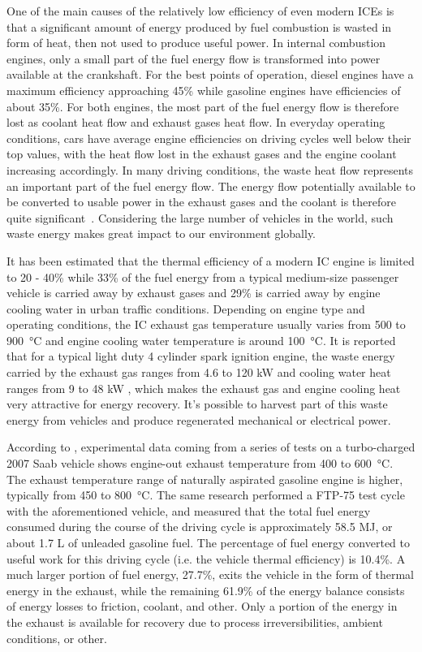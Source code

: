 One of the main causes of the relatively low efficiency of even modern ICEs is that a significant amount of energy produced by fuel combustion is wasted in form of heat, then not used to produce useful power. In internal combustion engines, only a small part of the fuel energy flow is transformed into power available at the crankshaft. For the best points of operation, diesel engines have a maximum efficiency approaching 45\% while gasoline engines have efficiencies of about 35\%. For both engines, the most part of the fuel energy flow is therefore lost as coolant heat flow and exhaust gases heat flow. In everyday operating conditions, cars have average engine efficiencies on driving cycles well below their top values, with the heat flow lost in the exhaust gases and the engine coolant increasing accordingly. In many driving conditions, the waste heat flow represents an important part of the fuel energy flow. The energy flow potentially available to be converted to usable power in the exhaust gases and the coolant is therefore quite significant~\cite{Boretti2012}. Considering the large number of vehicles in the world, such waste energy makes great impact to our environment globally.

It has been estimated that the thermal efficiency of a modern IC engine is limited to 20 - 40\% while 33\% of the fuel energy from a typical medium-size passenger vehicle is carried away by exhaust gases and 29\% is carried away by engine cooling water in urban traffic conditions. Depending on engine type and operating conditions, the IC exhaust gas temperature usually varies from 500 to \SI{900}{\celsius} and engine cooling water temperature is around \SI{100}{\celsius}. It is reported that for a typical light duty 4 cylinder spark ignition engine, the waste energy carried by the exhaust gas ranges from 4.6 to 120 kW and cooling water heat ranges from 9 to 48 kW \cite{ElChammas2005}, which makes the exhaust gas and engine cooling heat very attractive for energy recovery. It's possible to harvest part of this waste energy from vehicles and produce regenerated mechanical or electrical power.

According to \cite{Conklin2010}, experimental data coming from a series of tests on a turbo-charged 2007 Saab vehicle shows engine-out exhaust temperature from 400 to \SI{600}{\celsius}. The exhaust temperature range of naturally aspirated gasoline engine is higher, typically from 450 to \SI{800}{\celsius}. The same research performed a FTP-75 test cycle with the aforementioned vehicle, and measured that the total fuel energy consumed during the course of the driving cycle is approximately 58.5 MJ, or about 1.7 L of unleaded gasoline fuel. The percentage of fuel energy converted to useful work for this driving cycle (i.e. the vehicle thermal efficiency) is 10.4\%. A much larger portion of fuel energy, 27.7\%, exits the vehicle in the form of thermal energy in the exhaust, while the remaining 61.9\% of the energy balance consists of energy losses to friction, coolant, and other. Only a portion of the energy in the exhaust is available for recovery due to process irreversibilities, ambient conditions, or other.

